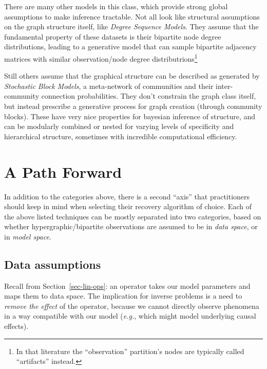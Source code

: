 \documentclass[%
	12pt,
		oneside,
		letterpaper
]{book}
\begin{document}
There are many other models in this class, which provide strong global assumptions to make inference tractable.
Not all look like structural assumptions on the graph structure itself, like \emph{Degree Sequence Models}. \autocite{backbonebipartiteprojections_Neal2014,Comparingalternativesfixed_Neal2021}
They assume that the fundamental property of these datasets is their bipartite node degree distributions, leading to a generative model that can sample bipartite adjacency matrices with similar observation/node degree distributrions\footnote{In that literature the ``observation'' partition's nodes are typically called ``artifacts'' instead.}

Still others assume that the graphical structure can be described as generated by \emph{Stochastic Block Models}, a meta-network of communities and their inter-community connection probabilities.
They don't constrain the graph class itself, but instead prescribe a generative process for graph creation (through community blocks).
These have very nice properties for bayesian inference of structure, and can be modularly combined or nested for varying levels of specificity and hierarchical structure, sometimes with incredible computational efficiency. \autocite{ReconstructingNetworksUnknown_Peixoto2018,NetworkReconstructionCommunity_Peixoto2019}

\section{A Path Forward}\label{a-path-forward}

In addition to the categories above, there is a second ``axis'' that practitioners should keep in mind when selecting their recovery algorithm of choice.
Each of the above listed techniques can be mostly separated into two categories, based on whether hypergraphic/bipartite observations are assumed to be in \emph{data space}, or in \emph{model space}.

\subsection{Data assumptions}\label{data-assumptions}

Recall from Section~\ref{sec-lin-ops}: an operator takes our model parameters and maps them to data space.
The implication for inverse problems is a need to \emph{remove the effect} of the operator, because we cannot directly observe phenomena in a way compatible with our model (\emph{e.g.}, which might model underlying causal effects).
\end{document}
